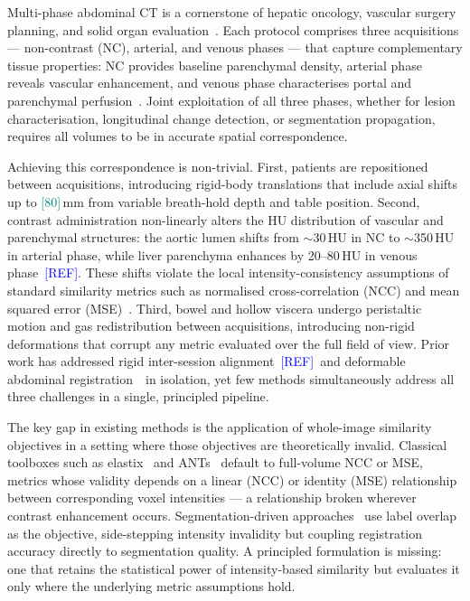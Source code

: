 \documentclass[10pt,twocolumn]{article}
\newcommand{\REF}{\textcolor{blue}{[REF]}}
\newcommand{\NUM}[1]{\textcolor{teal}{[#1]}}
\begin{document}
Multi-phase abdominal CT is a cornerstone of hepatic oncology,
vascular surgery planning, and solid organ evaluation~\cite{forner2018}.
Each protocol comprises three acquisitions — non-contrast (NC),
arterial, and venous phases — that capture complementary tissue
properties: NC provides baseline parenchymal density, arterial phase
reveals vascular enhancement, and venous phase characterises portal
and parenchymal perfusion~\cite{easl2018}.
Joint exploitation of all three phases, whether for lesion
characterisation, longitudinal change detection, or segmentation
propagation, requires all volumes to be in accurate spatial
correspondence.

Achieving this correspondence is non-trivial.
First, patients are repositioned between acquisitions, introducing
rigid-body translations that include axial shifts up to
\NUM{80}\,mm from variable breath-hold depth and table position.
Second, contrast administration non-linearly alters the HU distribution
of vascular and parenchymal structures: the aortic lumen shifts from
$\sim$30\,HU in NC to $\sim$350\,HU in arterial phase, while liver
parenchyma enhances by 20--80\,HU in venous phase~\REF.
These shifts violate the local intensity-consistency assumptions of
standard similarity metrics such as normalised cross-correlation (NCC)
and mean squared error (MSE)~\cite{pluim2003}.
Third, bowel and hollow viscera undergo peristaltic motion and gas
redistribution between acquisitions, introducing non-rigid deformations
that corrupt any metric evaluated over the full field of view.
Prior work has addressed rigid inter-session alignment~\REF\ and
deformable abdominal registration~\cite{metz2011,klein2010}\ in
isolation, yet few methods simultaneously address all three
challenges in a single, principled pipeline.

The key gap in existing methods is the application of whole-image
similarity objectives in a setting where those objectives are
theoretically invalid.
Classical toolboxes such as elastix~\cite{klein2010} and ANTs~\cite{avants2008}
default to full-volume NCC or MSE, metrics whose validity depends on
a linear (NCC) or identity (MSE) relationship between corresponding
voxel intensities — a relationship broken wherever contrast enhancement
occurs.
Segmentation-driven approaches~\cite{xu2019,hu2018} use label overlap
as the objective, side-stepping intensity invalidity but coupling
registration accuracy directly to segmentation quality.
A principled formulation is missing: one that retains the statistical
power of intensity-based similarity but evaluates it only where
the underlying metric assumptions hold.
\end{document}
